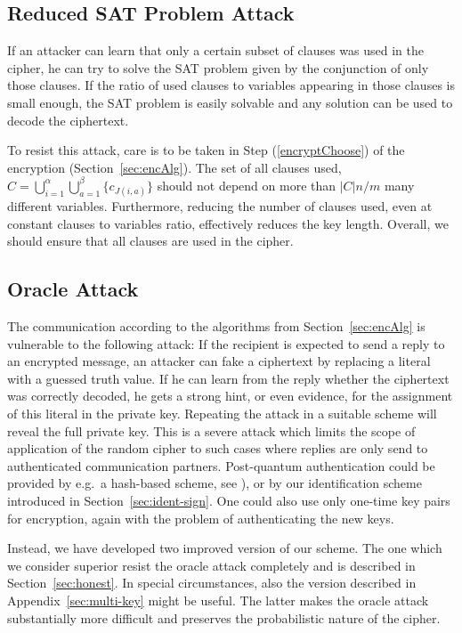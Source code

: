 \documentclass[final,journal,compsoc]{IEEEtran}
\begin{document}
\subsection{Reduced SAT Problem Attack\label{sec:reduced-sat-problem}}

If an attacker can learn that only a certain subset of clauses was used
in the cipher, he can try to solve the SAT problem given by the
conjunction of only those clauses. If the ratio of
used clauses to variables appearing in those clauses is
small enough, the SAT problem is easily solvable and any solution can be used to decode the ciphertext.

To resist this attack, care is to be taken in Step
(\ref{encryptChoose}) of the encryption
(Section~\ref{sec:encAlg}). The set of all clauses used, $C =
\bigcup_{i=1}^\alpha \bigcup_{a=1}^\beta \{c_{J(i,a)}\}$ should not
depend on more than $|C| n/m$ many different variables.  Furthermore,
reducing the number of clauses used, even at constant clauses to
variables ratio, effectively reduces the key length. Overall, we
should ensure that all clauses are used in the cipher.

\subsection{Oracle Attack\label{sec:oracle-attack}}
The communication according to the algorithms from
Section~\ref{sec:encAlg}  is vulnerable to the following
attack: If the recipient is expected to send a reply to an encrypted
message, an attacker can fake a ciphertext by replacing a literal with a
guessed truth value. If he can learn from the reply whether the ciphertext
was correctly decoded, he gets a strong hint, or even evidence, for the
assignment of this literal in the private key.  Repeating the attack
in a suitable scheme will reveal the full private key.
This is a severe attack which limits the scope of application of the
random cipher to such cases where replies are
only send to authenticated communication partners. Post-quantum
authentication could be provided by e.g.\ a hash-based scheme,
see \cite[Hash-based Digital Signature Schemes]{BBD09}), or by our
identification scheme introduced in Section~\ref{sec:ident-sign}.
One could also use only one-time key pairs for
encryption, again with the problem of authenticating the new keys.

Instead, we have developed two improved version of our scheme. The one
which we consider superior resist the oracle attack completely and is
described in Section~\ref{sec:honest}.  In special circumstances,
also the version described in Appendix~\ref{sec:multi-key} might
be useful. The latter makes the oracle attack substantially more
difficult and preserves the probabilistic nature of the cipher.
\end{document}
